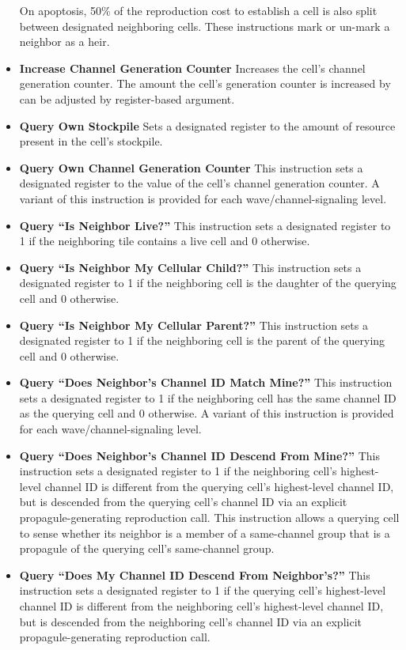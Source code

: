 \begin{itemize}
On apoptosis, 50\% of the reproduction cost to establish a cell is also split between designated neighboring cells.
These instructions mark or un-mark a neighbor as a heir.
\item \textbf{Increase Channel Generation Counter}
Increases the cell's channel generation counter.
The amount the cell's generation counter is increased by can be adjusted by register-based argument.
\item \textbf{Query Own Stockpile}
Sets a designated register to the amount of resource present in the cell's stockpile.
\item \textbf{Query Own Channel Generation Counter}
This instruction sets a designated register to the value of the cell's channel generation counter.
A variant of this instruction is provided for each wave/channel-signaling level.
\item \textbf{Query ``Is Neighbor Live?''}
This instruction sets a designated register to 1 if the neighboring tile contains a live cell and 0 otherwise.
\item \textbf{Query ``Is Neighbor My Cellular Child?''}
This instruction sets a designated register to 1 if the neighboring cell is the daughter of the querying cell and 0 otherwise.
\item \textbf{Query ``Is Neighbor My Cellular Parent?''}
This instruction sets a designated register to 1 if the neighboring cell is the parent of the querying cell and 0 otherwise.
\item \textbf{Query ``Does Neighbor's Channel ID Match Mine?''}
This instruction sets a designated register to 1 if the neighboring cell has the same channel ID as the querying cell and 0 otherwise.
A variant of this instruction is provided for each wave/channel-signaling level.
\item \textbf{Query ``Does Neighbor's Channel ID Descend From Mine?''}
This instruction sets a designated register to 1 if the neighboring cell's highest-level channel ID is different from the querying cell's highest-level channel ID, but is descended from the querying cell's channel ID via an explicit propagule-generating reproduction call.
This instruction allows a querying cell to sense whether its neighbor is a member of a same-channel group that is a propagule of the querying cell's same-channel group.
\item \textbf{Query ``Does My Channel ID Descend From Neighbor's?''}
This instruction sets a designated register to 1 if the querying cell's highest-level channel ID is different from the neighboring cell's highest-level channel ID, but is descended from the neighboring cell's channel ID  via an explicit propagule-generating reproduction call.

\end{itemize}
